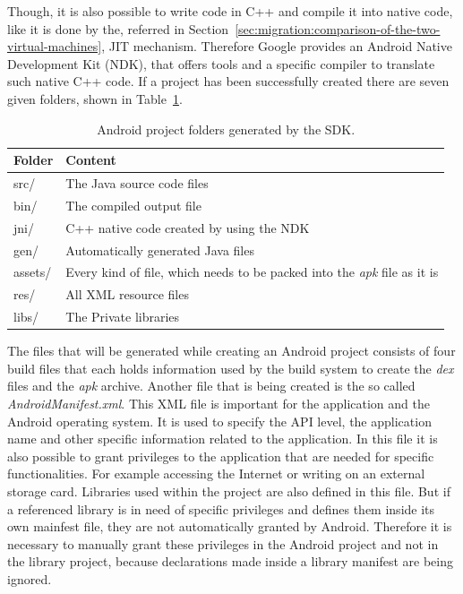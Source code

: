 Though, it is also possible to write code in C++ and compile it into native code, like it is done by the, referred in Section~\ref{sec:migration:comparison-of-the-two-virtual-machines}, JIT mechanism.
Therefore Google provides an Android Native Development Kit (NDK), that offers tools and a specific compiler to translate such native C++ code.
If a project has been successfully created there are seven given folders, shown in Table~\ref{tab:android-project-folders}.
\begin {table}[htpb] 
  \centering
\begin {tabular} {|l|l|}
	\hline
	Folder&Content\\
	\hline
	src/&The Java source code files\\
	\hline
	bin/&The compiled output file\\
	\hline
	jni/&C++ native code created by using the NDK\\
	\hline
	gen/&Automatically generated Java files\\
	\hline
	assets/&Every kind of file, which needs to be packed into the \textit{apk} file as it is\\
	\hline
	res/&All XML resource files\\
	\hline
	libs/&The Private libraries\\
	\hline
\end {tabular}
\caption {Android project folders generated by the SDK.}
\label {tab:android-project-folders}
\end {table}

The files that will be generated while creating an Android project consists of four build files that each holds information used by the build system to create the \textit{dex} files and the \textit{apk} archive.
Another file that is being created is the so called \textit{AndroidManifest.xml}.
This XML file is important for the application and the Android operating system.
It is used to specify the API level, the application name and other specific information related to the application.
In this file it is also possible to grant privileges to the application that are needed for specific functionalities.
For example accessing the Internet or writing on an external storage card.
Libraries used within the project are also defined in this file.
But if a referenced library is in need of specific privileges and defines them inside its own mainfest file, they are not automatically granted by Android.
Therefore it is necessary to manually grant these privileges in the Android project and not in the library project, because declarations made inside a library manifest are being ignored.



